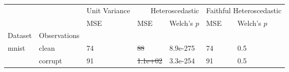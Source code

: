 \begin{tabular}{ll|l|ll|ll}
\toprule
 &  & Unit Variance & \multicolumn{2}{r}{Heteroscedastic} & \multicolumn{2}{r}{Faithful Heteroscedastic} \\
 &  & MSE & MSE & Welch's $p$ & MSE & Welch's $p$ \\
Dataset & Observations &  &  &  &  &  \\
\midrule
\multirow[c]{2}{*}{mnist} & clean & 74 & \sout{88} & 8.9e-275 & 74 & 0.5 \\
 & corrupt & 91 & \sout{1.1e+02} & 3.3e-254 & 91 & 0.5 \\
\bottomrule
\end{tabular}
